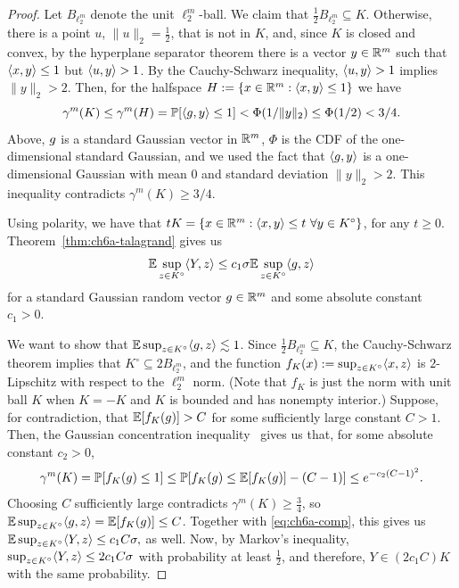 \begin{proof}%
Let $B_{\ell_2^m}$ denote the unit $\ell_2^m$-ball. We claim that $\frac12
B_{\ell_2^m}\subseteq K$. Otherwise, there is a point $u$, $\|u\|_2 = \frac12$,
that is not in $K$, and, since $K$ is closed and convex, by the
hyperplane separator theorem there is a vector $y \in \mathbb{R}^m$ such that
$\langle x,y\rangle \le 1$ but $\langle u,y\rangle > 1$. By the Cauchy-Schwarz inequality,
$\langle u,y\rangle > 1$ implies $\|y\|_2 > 2$. Then, for the halfspace $H
:= \{x \in \mathbb{R}^m: \langle x,y\rangle \le 1\}$ we have
\[
  \gamma^m(K) \le \gamma^m(H) = \mathbb{P}[\langle g,y\rangle \le 1] <
  \Phi(1/\|y\|_2) \leq \Phi(1/2) < 3/4.
\]
Above, $g$ is a standard Gaussian vector in $\mathbb{R}^m$, $\Phi$ is the
CDF of the one-dimensional standard Gaussian,  and we used the
fact that $\langle g,y\rangle$ is a one-dimensional Gaussian with mean $0$
and standard deviation $\|y\|_2 > 2$. This inequality contradicts
$\gamma^m(K) \ge 3/4$.

Using polarity, we have that $tK = \{x \in \mathbb{R}^m: \langle x,y\rangle \le t \
\forall y \in K^\circ\}$, for any $t \ge
0$. Theorem~\ref{thm:ch6a-talagrand} gives us 
\begin{equation}\label{eq:ch6a-comp}
  \mathbb{E} \sup_{z \in K^\circ} \langle Y,z\rangle \le c_1\sigma \mathbb{E}\sup_{z \in
    K^\circ} \langle g,z\rangle
\end{equation}
for a standard Gaussian random vector $g \in \mathbb{R}^m$ and some
absolute constant $c_1 >
0$. 

We want to show that $\mathbb{E}\sup_{z \in  K^\circ} \langle g,z\rangle \lesssim
1$. Since $\frac12 B_{\ell_2^m} \subseteq K$, the Cauchy-Schwarz theorem
implies that $K^\circ \subseteq 2B_{\ell_2^m}$, and the function
$f_K(x) := \sup_{z \in K^\circ} \langle x,z\rangle$
is $2$-Lipschitz with respect to the $\ell_2^m$ norm. (Note that $f_K$
is just the norm with unit ball $K$ when $K = -K$ and $K$ is bounded
and has nonempty interior.) Suppose, for contradiction, that
$\mathbb{E}[f_K(g)] > C$ for some sufficiently large constant $C > 1$. Then, the
Gaussian concentration inequality~\cite[Corollary~8.6.2]{vershynin} gives us that, for
some absolute constant $c_2 > 0$,
\[
  \gamma^m(K) = \mathbb{P}[f_K(g) \le 1]
  \leq \mathbb{P}[f_K(g) \le \mathbb{E}[f_K(g)] - (C-1)] \le e^{-c_2 (C-1)^2}.
\]
Choosing $C$ sufficiently large contradicts $\gamma^m(K) \ge
\frac34$, so $\mathbb{E}\sup_{z \in  K^\circ} \langle g,z\rangle = \mathbb{E}[f_K(g)]
\le C$. Together with \eqref{eq:ch6a-comp}, this gives us
\(
\mathbb{E} \sup_{z \in K^\circ} \langle Y,z\rangle\le c_1C\sigma ,
\)
as well. 
Now, by Markov's inequality, $\sup_{z \in K^\circ} \langle Y,z\rangle \le 2c_1C\sigma$ with probability at
least $\frac12$,  and
therefore, $Y \in (2c_1 C)K$ with the same probability.
\end{proof}

